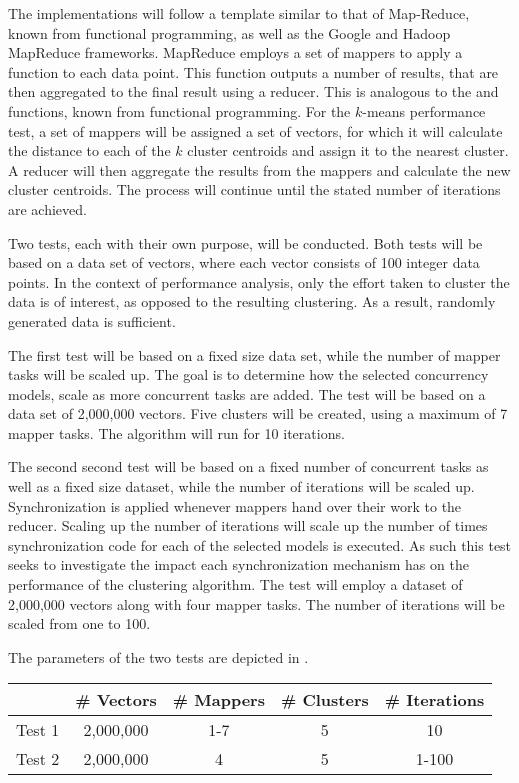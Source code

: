 The implementations will follow a template similar to that of Map-Reduce\cite{dean2008mapreduce}, known from functional programming, as well as the Google and Hadoop MapReduce frameworks. MapReduce employs a set of mappers to apply a function to each data point. This function outputs a number of results, that are then aggregated to the final result using a reducer. This is analogous to the  and  functions, known from functional programming. For the $k$-means performance test, a set of mappers will be assigned a set of vectors, for which it will calculate the distance to each of the $k$ cluster centroids and assign it to the nearest cluster. A reducer will then aggregate the results from the mappers and calculate the new cluster centroids. The process will continue until the stated number of iterations are achieved.

Two tests, each with their own purpose, will be conducted. Both tests will be based on a data set of vectors, where each vector consists of 100 integer data points. In the context of performance analysis, only the effort taken to cluster the data is of interest, as opposed to the resulting clustering. As a result, randomly generated data is sufficient.

The first test will be based on a fixed size data set, while the number of mapper tasks will be scaled up. The goal is to determine how the selected concurrency models, scale as more concurrent tasks are added. The test will be based on a data set of 2,000,000 vectors. Five clusters will be created, using a maximum of 7 mapper tasks. The algorithm will run for 10 iterations.

The second second test will be based on a fixed number of concurrent tasks as well as a fixed size dataset, while the number of iterations will be scaled up.  Synchronization is applied whenever mappers hand over their work to the reducer. Scaling up the number of iterations will scale up the number of times synchronization code for each of the selected models is executed. As such this test seeks to investigate the impact each synchronization mechanism has on the performance of the clustering algorithm. The test will employ a dataset of 2,000,000 vectors along with four mapper tasks. The number of iterations will be scaled from one to 100.

The parameters of the two tests are depicted in .

\begin{center}
\begin{table}[h]
\centering
\begin{tabular}{c|cccc}
       & \# Vectors        & \# Mappers			 	& \# Clusters & \# Iterations \\ \hline
Test 1 & 2,000,000         & 1-7        			& 5           & 10            \\
Test 2 & 2,000,000		   & 4          			& 5           & 1-100           
\end{tabular}
\end{table}
 \label{tab:test_description} 
\end{center}

